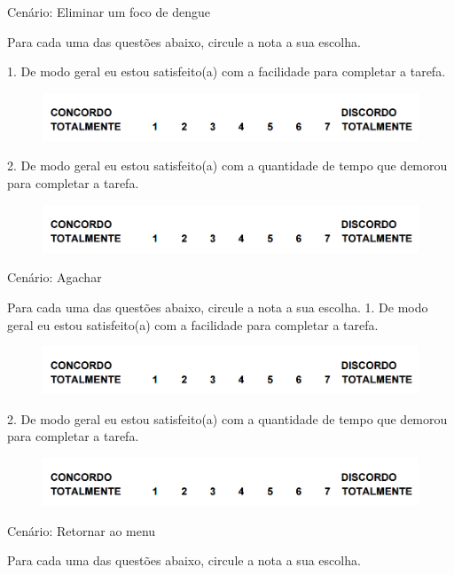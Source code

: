 \begin{flushleft}
Cenário: Eliminar um foco de dengue

Para cada uma das questões abaixo, circule a nota a sua escolha.

1. De modo geral eu estou satisfeito(a) com a facilidade para completar a tarefa.
\begin{figure}[H]	
	\centering
	\includegraphics[scale=0.6]{Imagens/questionarios.png}
	\label{f.questionarios}
\end{figure}
2. De modo geral eu estou satisfeito(a) com a quantidade de tempo que demorou para
completar a tarefa.
\begin{figure}[H]	
	\centering
	\includegraphics[scale=0.6]{Imagens/questionarios.png}
	\label{f.questionarios}
\end{figure}

Cenário: Agachar

Para cada uma das questões abaixo, circule a nota a sua escolha.
1. De modo geral eu estou satisfeito(a) com a facilidade para completar a tarefa.
\begin{figure}[H]	
	\centering
	\includegraphics[scale=0.6]{Imagens/questionarios.png}
	\label{f.questionarios}
\end{figure}

2. De modo geral eu estou satisfeito(a) com a quantidade de tempo que demorou para
completar a tarefa.
\begin{figure}[H]	
	\centering
	\includegraphics[scale=0.6]{Imagens/questionarios.png}
	\label{f.questionarios}
\end{figure}

Cenário: Retornar ao menu

Para cada uma das questões abaixo, circule a nota a sua escolha.


\end{flushleft}
